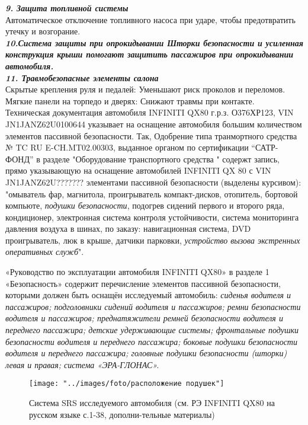 \textsl{{\textbf{9. Защита топливной системы}}}\\
Автоматическое отключение топливного насоса при ударе, чтобы предотвратить утечку и возгорание.\\
\textsl{{\textbf{10.Система защиты при опрокидывании
Шторки безопасности и усиленная конструкция крыши помогают защитить пассажиров при опрокидывании автомобиля.}}}\\
\textsl{{\textbf{11. Травмобезопасные элементы салона}}}\\
Скрытые крепления руля и педалей: Уменьшают риск проколов и переломов.\\
Мягкие панели на торпедо и дверях: Снижают травмы при контакте.\\


Техническая документация автомобиля  INFINITI QX80 г.р.з. О376ХР123, VIN JN1JANZ62U0100644 указывает на оснащение автомобиля большим количеством элементов пассивной безопасности. Так, Одобрение типа транмортного средства № TC RU E-CH.MT02.00303, выданное органом по сертификации	“САТР-ФОНД”  в разделе "Оборудование транспортного средства " содержт запись, прямо указывающую на оснащение автомобилей INFINITI QX 80 с VIN JN1JANZ62U??????? элементами пассивной безопасности (выделены курсивом): 
 "омыватель фар, магнитола, проигрыватель компакт-дисков, отопитель, бортовой компьюте,\textsl{ подушки безопасности}, подогрев сидений первого и второго ряда, кондиционер, электронная система контроля устойчивости, система мониторинга давления воздуха в шинах, по заказу: навигационная система, DVD проигрыватель, люк в крыше, датчики парковки, \textit{устройство вызова экстренных оперативных служб}". 
 
 «Руководство по эксплуатации автомобиля INFINITI QX80» в разделе 1 «Безопасность» содержит перечисление  элементов пассивной безопасности, которыми должен быть оснащён исследуемый автомобиль: \textsl{сиденья водителя и пассажиров; подголовники сидений водителя и пассажиров; ремни безопасности водителя и пассажиров; преднатяжители ремней безопасности водителя и переднего пассажира; детские удерживающие системы; фронтальные подушки безопасности водителя и переднего пассажира; боковые подушки безопасности водителя и переднего пассажира; головные подушки безопасности (шторки) левая и правая; система «ЭРА-ГЛОНАС».} 
 
 \begin{figure}[H]
 	\centering
 	\texttt{[image: "../images/foto/расположение подушек"]}
 	\caption{Система SRS исследуемого автомобиля (см. РЭ INFINITI QX80 на русском языке с.1-38, дополни-тельные материалы)}
 	\label{SRS}
 \end{figure}
 
